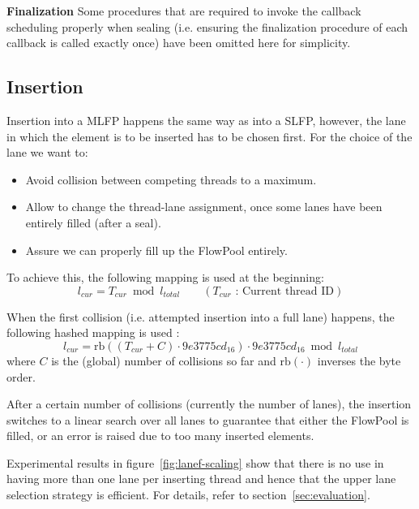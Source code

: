 \documentclass[runningheads,a4paper,fleqn]{llncs}
\begin{document}
\textbf{Finalization} Some procedures that are required to invoke the
callback scheduling properly when sealing (i.e. ensuring the
finalization procedure of each callback is called exactly once) have
been omitted here for simplicity.

\subsection{Insertion}
Insertion into a MLFP happens the same way as into a SLFP, however,
the lane in which the element is to be inserted has to be chosen
first. For the choice of the lane we want to:
\begin{itemize}
\item Avoid collision between competing threads to a maximum.
\item Allow to change the thread-lane assignment, once some lanes have
  been entirely filled (after a seal).
\item Assure we can properly fill up the FlowPool entirely.
\end{itemize}
To achieve this, the following mapping is used at the beginning:
\[ l_{cur} = T_{cur} \bmod l_{total} \qquad
  (T_{cur} \text{ : Current thread ID}) \] 

When the first collision (i.e. attempted insertion into a full lane)
happens, the following hashed mapping is used \cite{BSH}:
\[ l_{cur} = \mathrm{rb}((T_{cur} + C) \cdot 9e3775cd_{16})
   \cdot 9e3775cd_{16}  \bmod l_{total} \]
where $C$ is the (global) number of collisions so far and
$\mathrm{rb}(\cdot)$ inverses the byte order.

After a certain number of collisions (currently the number of lanes),
the insertion switches to a linear search over all lanes to guarantee
that either the FlowPool is filled, or an error is raised due to too
many inserted elements.

Experimental results in figure~\ref{fig:lanef-scaling} show that there
is no use in having more than one lane per inserting thread and hence
that the upper lane selection strategy is efficient. For details,
refer to section~\ref{sec:evaluation}. 
\end{document}
